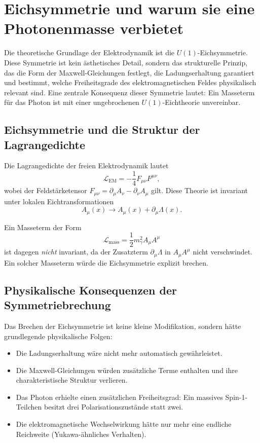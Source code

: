 
\section{Eichsymmetrie und warum sie eine Photonenmasse verbietet}

Die theoretische Grundlage der Elektrodynamik ist die $U(1)$-Eichsymmetrie. 
Diese Symmetrie ist kein ästhetisches Detail, sondern das strukturelle 
Prinzip, das die Form der Maxwell-Gleichungen festlegt, die 
Ladungserhaltung garantiert und bestimmt, welche Freiheitsgrade des 
elektromagnetischen Feldes physikalisch relevant sind. Eine zentrale 
Konsequenz dieser Symmetrie lautet: Ein Masseterm für das Photon ist mit 
einer ungebrochenen $U(1)$-Eichtheorie unvereinbar.

\subsection*{Eichsymmetrie und die Struktur der Lagrangedichte}

Die Lagrangedichte der freien Elektrodynamik lautet
\[
\mathcal{L}_{\mathrm{EM}} = -\frac{1}{4}F_{\mu\nu}F^{\mu\nu},
\]
wobei der Feldstärketensor 
$F_{\mu\nu} = \partial_\mu A_\nu - \partial_\nu A_\mu$
gilt.
Diese Theorie ist invariant unter lokalen Eichtransformationen
\[
A_\mu(x) \rightarrow A_\mu(x) + \partial_\mu \Lambda(x).
\]

Ein Masseterm der Form
\[
\mathcal{L}_{\mathrm{mass}} = \frac{1}{2}m_\gamma^2 A_\mu A^\mu
\]
ist dagegen \emph{nicht} invariant, da der Zusatzterm 
$\partial_\mu \Lambda$ in $A_\mu A^\mu$ nicht verschwindet.  
Ein solcher Masseterm würde die Eichsymmetrie explizit brechen.

\subsection*{Physikalische Konsequenzen der Symmetriebrechung}

Das Brechen der Eichsymmetrie ist keine kleine Modifikation, sondern hätte 
grundlegende physikalische Folgen:

\begin{itemize}
	\item Die Ladungserhaltung wäre nicht mehr automatisch gewährleistet.
	\item Die Maxwell-Gleichungen würden zusätzliche Terme enthalten und ihre 
	charakteristische Struktur verlieren.
	\item Das Photon erhielte einen zusätzlichen Freiheitsgrad:  
	Ein massives Spin-1-Teilchen besitzt drei Polarisationszustände 
	statt zwei.
	\item Die elektromagnetische Wechselwirkung hätte nur mehr eine endliche 
	Reichweite (Yukawa-ähnliches Verhalten).
\end{itemize}

